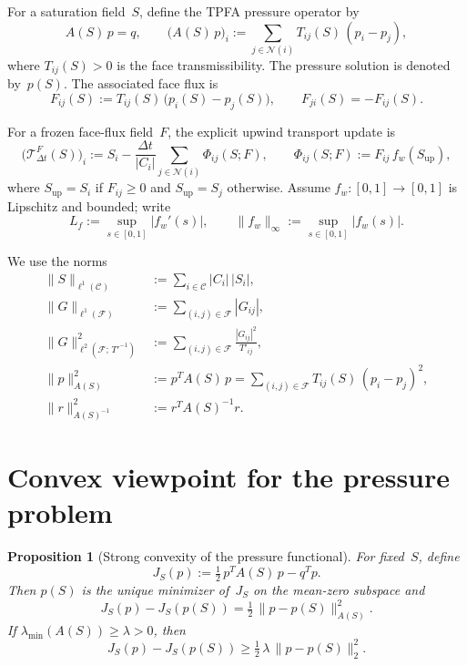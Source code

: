 \documentclass[11pt]{article}
\newtheorem{proposition}[theorem]{Proposition}
\begin{document}
For a saturation field~$S$, define the TPFA pressure operator by
\begin{equation}
  A(S)\,p = q,\qquad
  \bigl(A(S)\,p\bigr)_i
    := \sum_{j\in\mathcal{N}(i)} T_{ij}(S)\,(p_i - p_j),
\end{equation}
where $T_{ij}(S)>0$ is the face transmissibility.  The pressure solution is
denoted by~$p(S)$.  The associated face flux is
\begin{equation}
  F_{ij}(S) := T_{ij}(S)\,\bigl(p_i(S) - p_j(S)\bigr),\qquad
  F_{ji}(S) = -F_{ij}(S).
\end{equation}

For a frozen face-flux field~$F$, the explicit upwind transport update is
\begin{equation}\label{eq:transport-update}
  \bigl(\mathcal{T}^{F}_{\Delta t}(S)\bigr)_i
    := S_i - \frac{\Delta t}{|C_i|}
       \sum_{j\in\mathcal{N}(i)} \Phi_{ij}(S;F),\qquad
  \Phi_{ij}(S;F) := F_{ij}\,f_w(S_{\mathrm{up}}),
\end{equation}
where $S_{\mathrm{up}} = S_i$ if $F_{ij}\ge 0$ and $S_{\mathrm{up}} = S_j$
otherwise.  Assume $f_w:[0,1]\to[0,1]$ is Lipschitz and bounded; write
\[
  L_f := \sup_{s\in[0,1]}|f_w'(s)|,\qquad
  \|f_w\|_\infty := \sup_{s\in[0,1]}|f_w(s)|.
\]

We use the norms
\begin{align}
  \|S\|_{\ell^1(\mathcal{C})}
    &:= \sum_{i\in\mathcal{C}} |C_i|\,|S_i|,\\
  \|G\|_{\ell^1(\mathcal{F})}
    &:= \sum_{(i,j)\in\mathcal{F}} |G_{ij}|,\\
  \|G\|^2_{\ell^2(\mathcal{F};\,T'^{-1})}
    &:= \sum_{(i,j)\in\mathcal{F}} \frac{|G_{ij}|^2}{T'_{ij}},\\
  \|p\|^2_{A(S)}
    &:= p^T A(S)\,p
     = \sum_{(i,j)\in\mathcal{F}} T_{ij}(S)\,(p_i - p_j)^2,\\
  \|r\|^2_{A(S)^{-1}}
    &:= r^T A(S)^{-1} r.
\end{align}

\section{Convex viewpoint for the pressure problem}\label{sec:convex}

\begin{proposition}[Strong convexity of the pressure functional]\label{prop:strong-convex}
For fixed~$S$, define
\[
  J_S(p) := \tfrac{1}{2}\,p^T A(S)\,p - q^T p.
\]
Then $p(S)$ is the unique minimizer of~$J_S$ on the mean-zero subspace and
\[
  J_S(p) - J_S(p(S)) = \tfrac{1}{2}\,\|p - p(S)\|^2_{A(S)}.
\]
If $\lambda_{\min}(A(S))\ge\lambda>0$, then
\[
  J_S(p) - J_S(p(S)) \ge \tfrac{1}{2}\,\lambda\,\|p - p(S)\|^2_2.
\]
\end{proposition}
\end{document}
